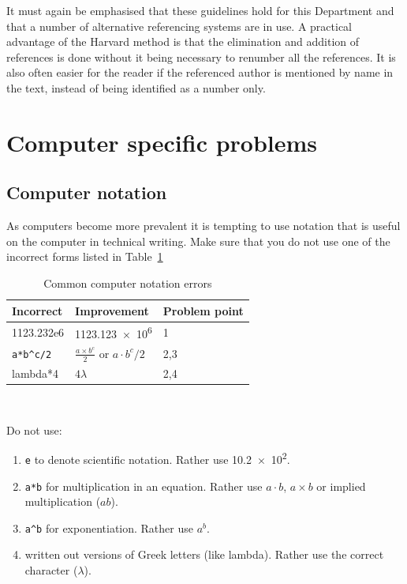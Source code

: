 \documentclass[a5paper, 10pt]{article}
\begin{document}
It must again be emphasised that these guidelines hold for this
Department and that a number of alternative referencing systems are in
use.  A practical advantage of the Harvard method is that the
elimination and addition of references is done without it being
necessary to renumber all the references.  It is also often easier for
the reader if the referenced author is mentioned by name in the text,
instead of being identified as a number only.

\section{Computer specific problems}
\label{app:computerproblems}
\subsection{Computer notation}
\label{sec:compnotation}

As computers become more prevalent it is tempting to use notation that
is useful on the computer in technical writing.  Make sure that you do
not use one of the incorrect forms listed in Table~\ref{tab:compnotation}
\begin{table}[htbp]
  \caption{Common computer notation errors}
  \label{tab:compnotation}
  \begin{centering}
    \begin{tabular}{lll}
      \toprule
      Incorrect & Improvement & Problem point \\
      \midrule
      1123.232e6 & \num{1123.123e6} & 1 \\
      \verb|a*b^c/2| & $\frac{a \times b^c}{2}$ or $a\cdot b^c / 2$ &
      2,3 \\
      lambda*4 & $4\lambda$ & 2,4 \\
      \bottomrule
    \end{tabular}\\
  \end{centering}
\end{table}

Do not use:
\begin{enumerate}
\item \verb|e| to denote scientific notation.  Rather use
  \num{10.2e2}.
\item \verb|a*b| for multiplication in an equation. Rather use
$a \cdot b$, $a \times b $ or implied multiplication ($ab$).
\item \verb|a^b| for exponentiation.  Rather use $a^b$.
\item written out versions of Greek letters (like lambda).  Rather use
  the correct character ($\lambda$).
\end{enumerate}
\end{document}
